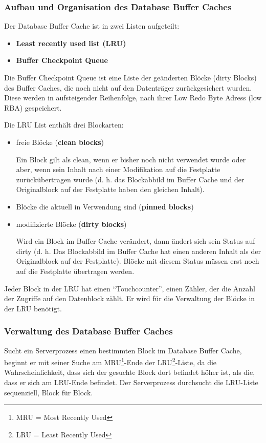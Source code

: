           \subsubsection{Aufbau und Organisation des Database Buffer Caches}
            Der Database Buffer Cache ist in zwei Listen aufgeteilt:
            \begin{itemize}
              \item \textbf{Least recently used list (LRU)}
              \item \textbf{Buffer Checkpoint Queue}
            \end{itemize}
						Die Buffer Checkpoint Queue ist eine Liste der geänderten Blöcke (dirty Blocks) des Buffer Caches, die noch nicht auf den Datenträger zurückgesichert wurden. Diese werden in aufsteigender Reihenfolge, nach ihrer Low Redo Byte Adress (low RBA) gespeichert.

            Die LRU List enthält drei Blockarten:
            \begin{itemize}
              \item freie Blöcke (\textbf{clean blocks})

              Ein Block gilt als clean, wenn er bisher noch nicht verwendet wurde oder aber, wenn sein Inhalt nach einer Modifikation auf die Festplatte zurückübertragen wurde (d. h. das Blockabbild im Buffer Cache und der Originalblock auf der Festplatte haben den gleichen Inhalt).
              \item Blöcke die aktuell in Verwendung sind (\textbf{pinned blocks})
              \item modifizierte Blöcke (\textbf{dirty blocks})

              Wird ein Block im Buffer Cache verändert, dann ändert sich sein Status auf dirty (d. h. Das Blockabbild im Buffer Cache hat einen anderen Inhalt als der Originalblock auf der Festplatte). Blöcke mit diesem Status müssen erst noch auf die Festplatte übertragen werden.
            \end{itemize}


            Jeder Block in der LRU hat einen \enquote{Touchcounter}, einen Zähler, der die Anzahl der Zugriffe auf den Datenblock zählt. Er wird für die Verwaltung der Blöcke in der LRU benötigt.
          \clearpage
		  \subsubsection{Verwaltung des Database Buffer Caches}
            Sucht ein Serverprozess einen bestimmten Block im Database Buffer Cache, beginnt er mit seiner Suche am MRU\footnote{MRU = Most Recently Used}-Ende der LRU\footnote{LRU = Least Recently Used}-Liste, da die Wahrscheinlichkeit, dass sich der gesuchte Block dort befindet höher ist, als die, dass er sich am LRU-Ende befindet. Der Serverprozess durchsucht die LRU-Liste sequenziell, Block für Block.

